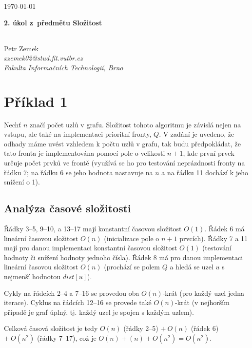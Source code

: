\documentclass[11pt,a4paper]{article}
\begin{document}
\begin{flushright}
	\today
\end{flushright}

\begin{center}
	\begin{large}\textbf{2. úkol z~předmětu Složitost}\end{large} \\
	\vspace{0.4cm}
	Petr Zemek \\
	\textit{xzemek02@stud.fit.vutbr.cz} \\
	\textit{Fakulta Informačních Technologií, Brno} \\
\end{center}

\section*{Příklad 1}

Nechť $n$ značí počet uzlů v grafu. Složitost tohoto algoritmu je závislá nejen na vstupu, ale také na implementaci prioritní fronty, $Q$. V zadání je uvedeno, že odhady máme uvést vzhledem k počtu uzlů v grafu, tak budu předpokládat, že tato fronta je implementována pomocí pole o velikosti $n + 1$, kde první prvek určuje počet prvků ve frontě (využívá se ho pro testování neprázdnosti fronty na řádku 7; na řádku 6 se jeho hodnota nastavuje na $n$ a na řádku 11 dochází k jeho snížení o 1).

\subsection*{Analýza časové složitosti}

Řádky 3--5, 9--10, a 13--17 mají konstantní časovou složitost $O(1)$. Řádek 6 má lineární časovou složitost $O(n)$ (inicializace pole o $n + 1$ prvcích). Řádky 7 a 11 mají pro danou implementaci konstantní časovou složitost $O(1)$ (testování hodnoty či snížení hodnoty jednoho čísla). Řádek 8 má pro danou implementaci lineární časovou složitost $O(n)$ (prochází se polem $Q$ a hledá se uzel $u$ s nejmenší hodnotou $dist[u]$).

Cykly na řádcích 2--4 a 7--16 se provedou oba $O(n)$-krát (pro každý uzel jedna iterace). Cyklus na řádcích 12--16 se provede také $O(n)$-krát (v nejhorším případě je graf úplný, tj. každý uzel je spojen s každým uzlem).

Celková časová složitost je tedy $O(n)$ (řádky 2--5) $+\ O(n)$ (řádek 6) $+\ O(n^{2})$ (řádky 7--17), což je $O(n) + (n) + O(n^{2}) = O(n^{2})$.
\end{document}
